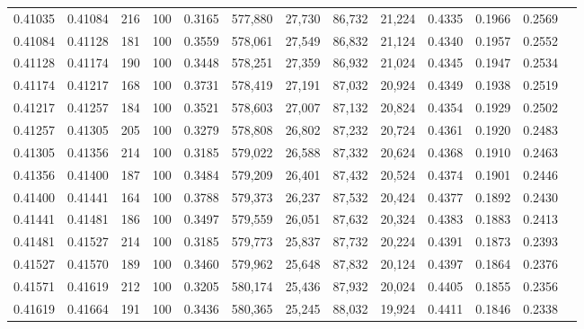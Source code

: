 \begin{tabular}{rrrrrrrrrrrrr}
0.41035 & 0.41084 &   216 & 100 &                                     0.3165 & 577,880 &  27,730 &  86,732 &  21,224 & 0.4335 & 0.1966 & 0.2569 \\
0.41084 & 0.41128 &   181 & 100 &                                     0.3559 & 578,061 &  27,549 &  86,832 &  21,124 & 0.4340 & 0.1957 & 0.2552 \\
0.41128 & 0.41174 &   190 & 100 &                                     0.3448 & 578,251 &  27,359 &  86,932 &  21,024 & 0.4345 & 0.1947 & 0.2534 \\
0.41174 & 0.41217 &   168 & 100 &                                     0.3731 & 578,419 &  27,191 &  87,032 &  20,924 & 0.4349 & 0.1938 & 0.2519 \\
0.41217 & 0.41257 &   184 & 100 &                                     0.3521 & 578,603 &  27,007 &  87,132 &  20,824 & 0.4354 & 0.1929 & 0.2502 \\
0.41257 & 0.41305 &   205 & 100 &                                     0.3279 & 578,808 &  26,802 &  87,232 &  20,724 & 0.4361 & 0.1920 & 0.2483 \\
0.41305 & 0.41356 &   214 & 100 &                                     0.3185 & 579,022 &  26,588 &  87,332 &  20,624 & 0.4368 & 0.1910 & 0.2463 \\
0.41356 & 0.41400 &   187 & 100 &                                     0.3484 & 579,209 &  26,401 &  87,432 &  20,524 & 0.4374 & 0.1901 & 0.2446 \\
0.41400 & 0.41441 &   164 & 100 &                                     0.3788 & 579,373 &  26,237 &  87,532 &  20,424 & 0.4377 & 0.1892 & 0.2430 \\
0.41441 & 0.41481 &   186 & 100 &                                     0.3497 & 579,559 &  26,051 &  87,632 &  20,324 & 0.4383 & 0.1883 & 0.2413 \\
0.41481 & 0.41527 &   214 & 100 &                                     0.3185 & 579,773 &  25,837 &  87,732 &  20,224 & 0.4391 & 0.1873 & 0.2393 \\
0.41527 & 0.41570 &   189 & 100 &                                     0.3460 & 579,962 &  25,648 &  87,832 &  20,124 & 0.4397 & 0.1864 & 0.2376 \\
0.41571 & 0.41619 &   212 & 100 &                                     0.3205 & 580,174 &  25,436 &  87,932 &  20,024 & 0.4405 & 0.1855 & 0.2356 \\
0.41619 & 0.41664 &   191 & 100 &                                     0.3436 & 580,365 &  25,245 &  88,032 &  19,924 & 0.4411 & 0.1846 & 0.2338 \\

\end{tabular}

